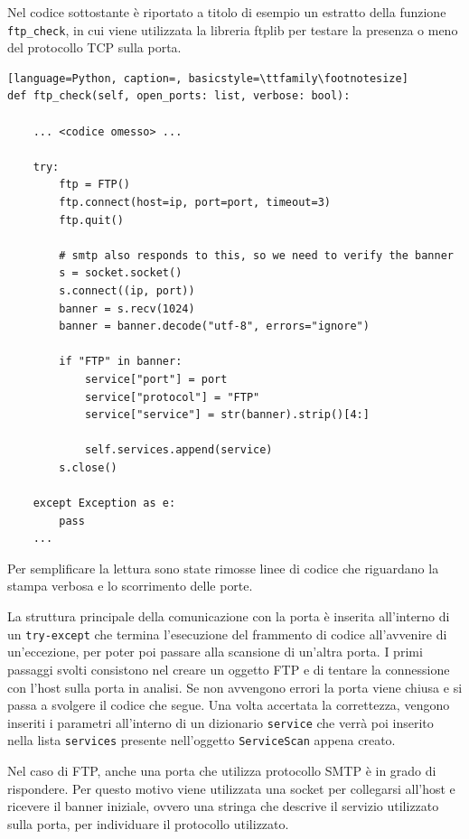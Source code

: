 \documentclass[12pt]{report}
\begin{document}
Nel codice sottostante è riportato a titolo di esempio un estratto della funzione \\\lstinline{ftp_check}, in cui viene utilizzata la libreria ftplib per testare la presenza o meno del protocollo TCP sulla porta.

\begin{lstlisting}[language=Python, caption=, basicstyle=\ttfamily\footnotesize]
def ftp_check(self, open_ports: list, verbose: bool):
    
    ... <codice omesso> ...
    
    try:
        ftp = FTP()
        ftp.connect(host=ip, port=port, timeout=3)
        ftp.quit()

        # smtp also responds to this, so we need to verify the banner
        s = socket.socket()
        s.connect((ip, port))
        banner = s.recv(1024)
        banner = banner.decode("utf-8", errors="ignore")

        if "FTP" in banner:
            service["port"] = port
            service["protocol"] = "FTP"
            service["service"] = str(banner).strip()[4:]

            self.services.append(service)
        s.close()

    except Exception as e:
        pass
    ...
\end{lstlisting}

Per semplificare la lettura sono state rimosse linee di codice che riguardano la stampa verbosa e lo scorrimento delle porte. 

La struttura principale della comunicazione con la porta è inserita all'interno di un \lstinline{try-except} che termina l'esecuzione del frammento di codice all'avvenire di un'eccezione, per poter poi passare alla scansione di un'altra porta. I primi passaggi svolti consistono nel creare un oggetto FTP e di tentare la connessione con l'host sulla porta in analisi. Se non avvengono errori la porta viene chiusa e si passa a svolgere il codice che segue. Una volta accertata la correttezza, vengono inseriti i parametri all'interno di un dizionario \lstinline{service} che verrà poi inserito nella lista \lstinline{services} presente nell'oggetto \lstinline{ServiceScan} appena creato.

Nel caso di FTP, anche una porta che utilizza protocollo SMTP è in grado di rispondere. Per questo motivo viene utilizzata una socket per collegarsi all'host e ricevere il banner iniziale, ovvero una stringa che descrive il servizio utilizzato sulla porta, per individuare il protocollo utilizzato. 
\end{document}

